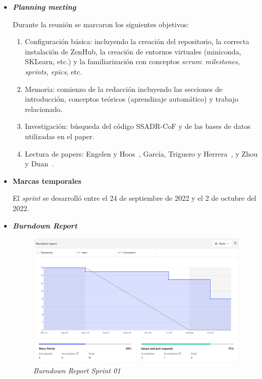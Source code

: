 \begin{itemize}
	\item \textbf{\textit{Planning meeting}}
	
	Durante la reunión se marcaron los siguientes objetivos:
	
	\begin{enumerate}
		\item Configuración básica: incluyendo la creación del repositorio, la correcta instalación de ZenHub, la creación de entornos virtuales (miniconda, SKLearn, etc.) y la familiarización con conceptos \textit{scrum}: \textit{milestones, sprints, epics}, etc.
		
		\item Memoria: comienzo de la redacción incluyendo las secciones de introducción, conceptos teóricos (aprendizaje automático) y trabajo relacionado.
		
		\item Investigación: búsqueda del código SSADR-CoF y de las bases de datos utilizadas en el paper.
		
		\item Lectura de papers: Engelen y Hoos~\cite{engelen2020surveyOnSemiSupervised}, García, Triguero y Herrera~\cite{triguero2015SelflabeledTechniques}, y Zhou y Duan~\cite{zhou2021SemisupervisedRecommendationAttack}.
	\end{enumerate}
	
	\item \textbf{Marcas temporales}
	
	El \textit{sprint} se desarrolló entre el 24 de septiembre de 2022 y el 2 de octubre del 2022.
	
	\item \textbf{\textit{Burndown Report}}
	
	\begin{figure}[h]
		\caption{\textit{Burndown Report Sprint 01}}
		\centering
		\includegraphics[width=\textwidth]{../img/anexos/s01_bdr}
	\end{figure}
	

\end{itemize}
